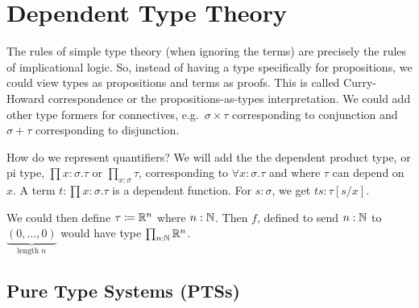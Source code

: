 \section{Dependent Type Theory}


The rules of simple type theory (when ignoring the terms) are precisely the rules of implicational logic.
So, instead of having a type specifically for propositions, we could view types as propositions and terms as proofs.
This is called \alert{Curry-Howard correspondence} or the \alert{propositions-as-types interpretation}.
We could add other type formers for connectives, e.g.\ $\sigma \times \tau$ corresponding to conjunction and $\sigma + \tau$ corresponding to disjunction.

How do we represent quantifiers?
We will add the the \alert{dependent product type}, or \alert{pi type}, $\prod x : \sigma. \tau$ or $\prod_{x : \sigma} \tau$, corresponding to $\forall x : \sigma. \tau$ and where $\tau$ can depend on $x$.
A term $t : \prod x : \sigma. \tau$ is a dependent function.
For $s : \sigma$, we get $ts : \tau[s/x]$.

\begin{example}
    We could then define $\tau \coloneq \mathbb{R}^n$ where $n : \mathbb{N}$.
    Then $f$, defined to send $n : \mathbb{N}$ to $\underbrace{(0, \dots, 0)}_{\text{length }n}$ would have type $\prod_{n : \mathbb{N}} \mathbb{R}^n$.
\end{example}

\subsection{Pure Type Systems (PTSs)}

